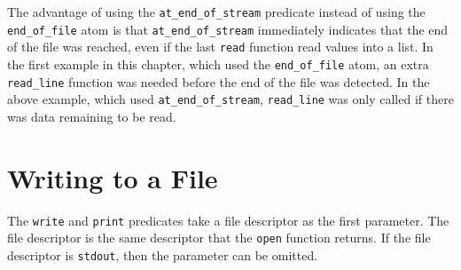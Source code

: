 The advantage of using the \texttt{at\_end\_of\_stream} predicate instead of using the \texttt{end\_of\_file} atom is that \texttt{at\_end\_of\_stream} immediately indicates that the end of the file was reached, even if the last \texttt{read} function read values into a list. In the first example in this chapter, which used the \texttt{end\_of\_file} atom, an extra \texttt{read\_line} function was needed before the end of the file was detected.  In the above example, which used \texttt{at\_end\_of\_stream}, \texttt{read\_line} was only called if there was data remaining to be read.

\section{Writing to a File}
The \texttt{write} and \texttt{print} predicates take a file descriptor as the first parameter.  The file descriptor is the same descriptor that the \texttt{open} function returns. If the file descriptor is \texttt{stdout}, then the parameter can be omitted.
